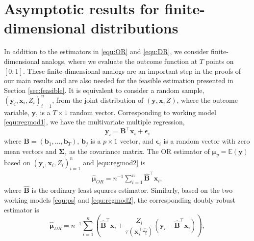 \documentclass[12pt, A4]{article}
\newcommand{\SumOverN}{\sum_{i=1}^n}
\newcommand{\ObsRes}{\textbf{y}_i}
\newcommand{\ObsCov}{\textbf{x}_i}
\newcommand{\RegCoe}{\textbf{b}}
\newcommand{\LogCoe}{\boldsymbol{\gamma}}
\begin{document}



\newpage

\appendix
{}
\section{Asymptotic results for finite-dimensional distributions}\label{finite.app} %
In addition to the estimators in \eqref{equ:OR} and \eqref{equ:DR}, we consider finite-dimensional analogs, where we evaluate the outcome function at $T$ points on $[0,1]$. 
    These finite-dimensional analogs are an important step in the proofs of our main results and are also needed for the feasible estimation presented in Section \ref{sec:feasible}.    
    It is equivalent to consider a random sample, $(\ObsRes, \ObsCov, Z_i)_{i=1}^n$, from the joint distribution of $(\textbf{y}, \textbf{x}, Z)$, where the outcome variable, $\textbf{y}$, is a $T \times 1$ random vector.
    Corresponding to working model \eqref{equ:regmod1}, we have the multivariate multiple regression,
        \begin{equation}\label{equ:regmod2}
            \ObsRes = \textbf{B}^{\top} \ObsCov + \boldsymbol{\epsilon}_i
        \end{equation}
    where $\textbf{B} = (\RegCoe_1, \dots, \RegCoe_T)$, $\RegCoe_j$ is a $p \times 1$ vector,  and $\boldsymbol{\epsilon}_i$ is a random vector with zero mean vectors and $\boldsymbol{\Sigma}_{\epsilon}$ as the covariance matrix.    
    The OR estimator of $\boldsymbol{\mu}_{y} = \mathbb{E}(\textbf{y})$ based on $(\ObsRes, \ObsCov, Z_i)_{i=1}^n$ and \eqref{equ:regmod2} is
        \begin{align}\label{equ:OR2}
            \hat{\boldsymbol{\mu}}_{OR} = n^{-1}\SumOverN \hat{\textbf{B}}^{\top}\ObsCov,
        \end{align}
    where $\hat{\textbf{B}}$ is the ordinary least squares estimator.
    Similarly, based on the two working models \eqref{equ:ps} and \eqref{equ:regmod2}, the corresponding doubly robust estimator is
        \begin{equation}\label{equ:DR2}
            \hat{\boldsymbol{\mu}}_{DR} = n^{-1} \SumOverN \left( \hat{\textbf{B}}^{\top}\ObsCov + \frac{Z_i}{\tau(\ObsCov^{\top}\hat{\LogCoe})}(\ObsRes -\hat{\textbf{B}}^{\top}\ObsCov)  \right),
        \end{equation}
\end{document}
